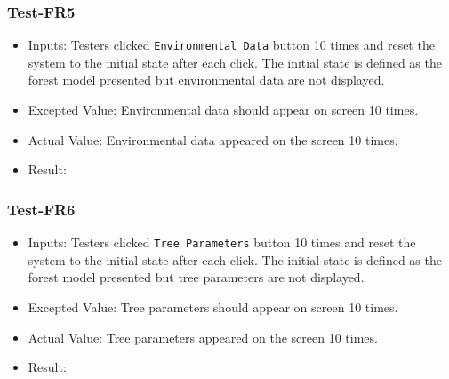 \documentclass[12pt, titlepage]{article}
\begin{document}
\subsubsection{Test-FR5}
\begin{itemize}
\item Inputs: Testers clicked \verb|Environmental Data| button
10 times and reset the system to the initial state after each click.
The initial state is defined as the forest model presented but
environmental data are not displayed.
\item Excepted Value: Environmental data should appear on screen 10
times.
\item Actual Value: Environmental data appeared on the screen 10 times.
\item Result: \pass
\end{itemize}

\subsubsection{Test-FR6}
\begin{itemize}
\item Inputs: Testers clicked \verb|Tree Parameters| button
10 times and reset the system to the initial state after each click.
The initial state is defined as the forest model presented but tree 
parameters are not displayed.
\item Excepted Value: Tree parameters should appear on screen 10 
times.
\item Actual Value: Tree parameters appeared on the screen  10 times.
\item Result: \pass
\end{itemize}

\end{document}
